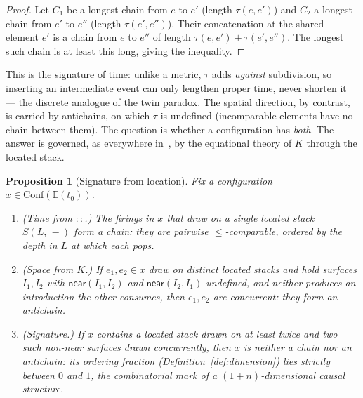 \documentclass[11pt]{article}
\theoremstyle{definition}
\theoremstyle{plain}
\newtheorem{proposition}[definition]{Proposition}
\newcommand{\near}{\mathsf{near}}
\newcommand{\lstk}[2]{S(#1,\, #2)}     %
\newcommand{\cons}{\mathbin{::}}        %
\newcommand{\Conf}{\mathrm{Conf}}
\newcommand{\Ev}{\mathbb{E}}
\newcommand{\propertime}{\tau}
\theoremstyle{remark}
\begin{document}
\begin{proof}
Let $C_1$ be a longest chain from $e$ to $e'$ (length
$\propertime(e,e')$) and $C_2$ a longest chain from $e'$ to $e''$
(length $\propertime(e',e'')$). Their concatenation at the shared element
$e'$ is a chain from $e$ to $e''$ of length
$\propertime(e,e') + \propertime(e',e'')$. The longest such chain is at
least this long, giving the inequality.
\end{proof}

This is the signature of time: unlike a metric, $\propertime$ adds
\emph{against} subdivision, so inserting an intermediate event can only
lengthen proper time, never shorten it --- the discrete analogue of the
twin paradox. The spatial direction, by contrast, is carried by
antichains, on which $\propertime$ is undefined (incomparable elements
have no chain between them). The question is whether a configuration has
\emph{both}. The answer is governed, as everywhere in~\cite{CostNote}, by
the equational theory of $K$ through the located stack.

\begin{proposition}[Signature from location]
\label{prop:signature}
Fix a configuration $x \in \Conf(\Ev(t_0))$.
\begin{enumerate}[label=\textup{(\alph*)},leftmargin=2.2em,itemsep=2pt]
  \item \emph{(Time from $\cons$.)} The firings in $x$ that draw on a
  single located stack $\lstk{L}{-}$ form a chain: they are pairwise
  $\le$-comparable, ordered by the depth in $L$ at which each pops.
  \item \emph{(Space from $K$.)} If $e_1, e_2 \in x$ draw on distinct
  located stacks and hold surfaces $I_1, I_2$ with $\near(I_1,I_2)$ and
  $\near(I_2,I_1)$ undefined, and neither produces an introduction the
  other consumes, then $e_1, e_2$ are concurrent: they form an antichain.
  \item \emph{(Signature.)} If $x$ contains a located stack drawn on at
  least twice \emph{and} two such non-near surfaces drawn concurrently,
  then $x$ is neither a chain nor an antichain: its ordering fraction
  (Definition~\ref{def:dimension}) lies strictly between $0$ and $1$, the
  combinatorial mark of a $(1{+}n)$-dimensional causal structure.
\end{enumerate}
\end{proposition}
\end{document}
